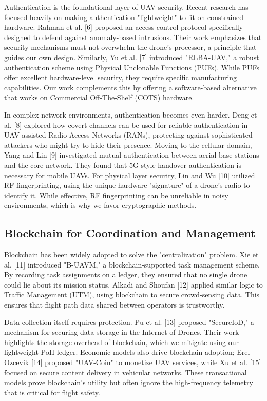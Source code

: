 \documentclass[preprint,12pt]{elsarticle}
\begin{document}
Authentication is the foundational layer of UAV security. Recent research has focused heavily on making authentication "lightweight" to fit on constrained hardware. Rahman et al. [6] proposed an access control protocol specifically designed to defend against anomaly-based intrusions. Their work emphasizes that security mechanisms must not overwhelm the drone's processor, a principle that guides our own design. Similarly, Yu et al. [7] introduced "RLBA-UAV," a robust authentication scheme using Physical Unclonable Functions (PUFs). While PUFs offer excellent hardware-level security, they require specific manufacturing capabilities. Our work complements this by offering a software-based alternative that works on Commercial Off-The-Shelf (COTS) hardware.


In complex network environments, authentication becomes even harder. Deng et al. [8] explored how covert channels can be used for reliable authentication in UAV-assisted Radio Access Networks (RANs), protecting against sophisticated attackers who might try to hide their presence. Moving to the cellular domain, Yang and Lin [9] investigated mutual authentication between aerial base stations and the core network. They found that 5G-style handover authentication is necessary for mobile UAVs. For physical layer security, Lin and Wu [10] utilized RF fingerprinting, using the unique hardware "signature" of a drone's radio to identify it. While effective, RF fingerprinting can be unreliable in noisy environments, which is why we favor cryptographic methods.

\subsection{Blockchain for Coordination and Management}
\label{subsec2-2}
Blockchain has been widely adopted to solve the "centralization" problem. Xie et al. [11] introduced "B-UAVM," a blockchain-supported task management scheme. By recording task assignments on a ledger, they ensured that no single drone could lie about its mission status. Alkadi and Shoufan [12] applied similar logic to Traffic Management (UTM), using blockchain to secure crowd-sensing data. This ensures that flight path data shared between operators is trustworthy.


Data collection itself requires protection. Pu et al. [13] proposed "SecureIoD," a mechanism for securing data storage in the Internet of Drones. Their work highlights the storage overhead of blockchain, which we mitigate using our lightweight PoH ledger. Economic models also drive blockchain adoption; Erel-Ozcevik [14] proposed "UAV-Coin" to monetize UAV services, while Xu et al. [15] focused on secure content delivery in vehicular networks. These transactional models prove blockchain's utility but often ignore the high-frequency telemetry that is critical for flight safety.
\end{document}
